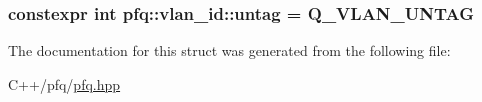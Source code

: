 \subsubsection[{\texorpdfstring{untag}{untag}}]{\setlength{\rightskip}{0pt plus 5cm}constexpr int pfq\+::vlan\+\_\+id\+::untag = Q\+\_\+\+V\+L\+A\+N\+\_\+\+U\+N\+T\+AG\hspace{0.3cm}{\ttfamily [static]}}\hypertarget{structpfq_1_1vlan__id_a9e30bbd86d62e58ae5e5e080f7e046df}{}\label{structpfq_1_1vlan__id_a9e30bbd86d62e58ae5e5e080f7e046df}


The documentation for this struct was generated from the following file\+:\begin{DoxyCompactItemize}
\item 
C++/pfq/\hyperlink{pfq_8hpp}{pfq.\+hpp}\end{DoxyCompactItemize}
